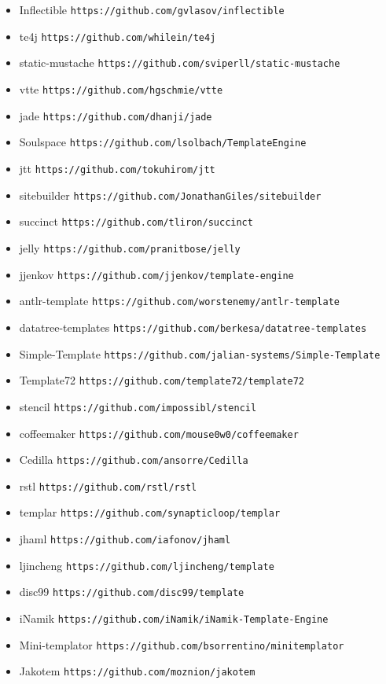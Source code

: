 \begin{singlespace}
\begin{itemize}
\item Inflectible \verb!https://github.com/gvlasov/inflectible!
\item te4j \verb!https://github.com/whilein/te4j!
\item static-mustache \verb!https://github.com/sviperll/static-mustache!
\item vtte \verb!https://github.com/hgschmie/vtte!
\item jade \verb!https://github.com/dhanji/jade!
\item Soulspace \verb!https://github.com/lsolbach/TemplateEngine!
\item jtt \verb!https://github.com/tokuhirom/jtt!
\item sitebuilder \verb!https://github.com/JonathanGiles/sitebuilder!
\item succinct \verb!https://github.com/tliron/succinct!
\item jelly \verb!https://github.com/pranitbose/jelly!
\item jjenkov \verb!https://github.com/jjenkov/template-engine!
\item antlr-template \verb!https://github.com/worstenemy/antlr-template!
\item datatree-templates \verb!https://github.com/berkesa/datatree-templates!
\item Simple-Template \verb!https://github.com/jalian-systems/Simple-Template!
\item Template72 \verb!https://github.com/template72/template72!
\item stencil \verb!https://github.com/impossibl/stencil!
\item coffeemaker \verb!https://github.com/mouse0w0/coffeemaker!
\item Cedilla \verb!https://github.com/ansorre/Cedilla!
\item rstl \verb!https://github.com/rstl/rstl!
\item templar \verb!https://github.com/synapticloop/templar!
\item jhaml \verb!https://github.com/iafonov/jhaml!
\item ljincheng \verb!https://github.com/ljincheng/template!
\item disc99 \verb!https://github.com/disc99/template!
\item iNamik \verb!https://github.com/iNamik/iNamik-Template-Engine!
\item Mini-templator \verb!https://github.com/bsorrentino/minitemplator!
\item Jakotem \verb!https://github.com/moznion/jakotem!

\end{itemize}
\end{singlespace}
